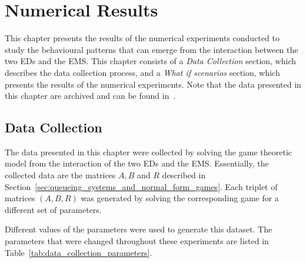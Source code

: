 \chapter{Numerical Results}\label{sec:numerical_results}

This chapter presents the results of the numerical experiments conducted to
study the behavioural patterns that can emerge from the interaction between the
two EDs and the EMS.
This chapter consists of a \textit{Data Collection} section, which describes the
data collection process, and a \textit{What if scenarios} section, which
presents the results of the numerical experiments.
Note that the data presented in this chapter are archived and can be found
in~\cite{michalis_panayides_2023_7501988}.


\section{Data Collection}\label{sec:data_collection}

The data presented in this chapter were collected by solving the game theoretic
model from the interaction of the two EDs and the EMS.
Essentially, the collected data are the matrices \(A, B\) and \(R\) described
in Section~\ref{sec:queueing_systems_and_normal_form_games}.
Each triplet of matrices \((A, B, R)\) was generated by solving the
corresponding game for a different set of parameters.

Different values of the parameters were used to generate this dataset.
The parameters that were changed throughout these experiments are listed in
Table~\ref{tab:data_collection_parameters}.

